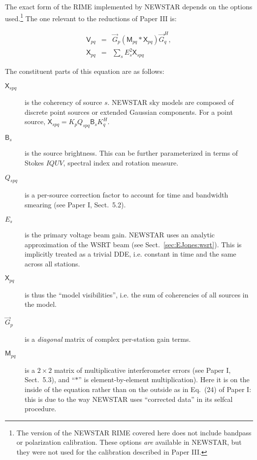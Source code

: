 \documentclass[referee]{aa}
\newcommand{\herm}{H}
\newcommand{\jones}[2]{\vec {#1}_{#2}}
\newcommand{\jonesT}[2]{\vec {#1}^{\herm}_{#2}}
\newcommand{\coh}[2]{\mathsf{{#1}}_{{#2}}}
\begin{document}
The exact form of the RIME implemented by NEWSTAR depends on the options used.\footnote{The version of the NEWSTAR RIME covered here does not include bandpass or polarization calibration. These options \emph{are} available in NEWSTAR, but they were not used for the calibration described in Paper III.} The one relevant to the reductions of Paper III is:

\begin{eqnarray}\label{eq:newstar-rime}
\coh{V}{pq} & = & \jones{G}{p} \left ( \coh{M}{pq} \ast \coh{X}{pq} \right ) \jonesT{G}{q}, \\
\nonumber \coh{X}{pq} & = & \sum_{s} E^2_s \coh{X}{spq} 
\end{eqnarray}

The constituent parts of this equation are as follows:
\begin{description}
\item[$\coh{X}{spq}$] is the coherency of source $s$. NEWSTAR sky models are composed of discrete point sources or extended Gaussian components. For a point source, $\coh{X}{spq} = K_p Q_{spq} \coh{B}{s} K^\herm_q$.

\item[$\coh{B}{s}$] is the source brightness. This can be further parameterized in terms of Stokes $IQUV$, spectral index and rotation measure.

\item[$Q_{spq}$] is a per-source correction factor to account for time and bandwidth smearing (see Paper I, Sect.~5.2).

\item[$E_s$] is the primary voltage beam gain. NEWSTAR uses an analytic approximation of the WSRT beam (see Sect.~\ref{sec:EJones:wsrt}). This is implicitly treated as a trivial DDE, i.e. constant in time and the same across all stations.

\item[$\coh{X}{pq}$] is thus the ``model visibilities'', i.e. the sum of coherencies of all sources in the model.

\item[$\jones{G}{p}$] is a {\em diagonal} matrix of complex per-station gain terms.

\item[$\coh{M}{pq}$] is a $2\times2$ matrix of multiplicative interferometer errors (see Paper I, Sect.~5.3), and ``$\ast$'' is element-by-element multiplication). Here it is on the inside of the equation rather than on the outside as in Eq.~(24) of Paper I: this is due to the way NEWSTAR uses ``corrected data'' in its selfcal procedure.%

\end{description}
\end{document}
